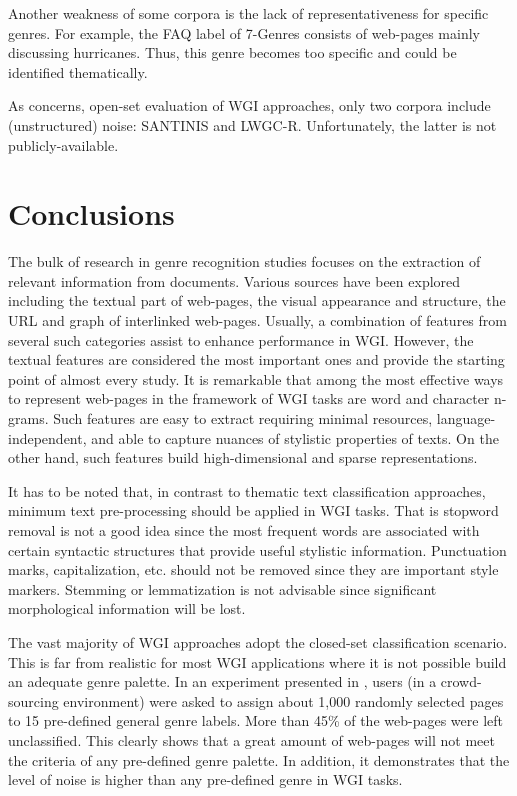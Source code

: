 \begin{itemize}
\begin{end}
Another weakness of some corpora is the lack of representativeness for specific genres. For example, the FAQ label of 7-Genres consists of web-pages mainly discussing hurricanes. Thus, this genre becomes too specific and could be identified thematically. 

As concerns, open-set evaluation of WGI approaches, only two corpora include (unstructured) noise: SANTINIS and LWGC-R. Unfortunately, the latter is not publicly-available. 

\section{Conclusions}\label{chap:relevant_work:sec:intro}

The bulk of research in genre recognition studies focuses on the extraction of relevant information from documents. Various sources have been explored including the textual part of web-pages, the visual appearance and structure, the URL and graph of interlinked web-pages. Usually, a combination of features from several such categories assist to enhance performance in WGI. However, the textual features are considered the most important ones and provide the starting point of almost every study. It is remarkable that among the most effective ways to represent web-pages in the framework of WGI tasks are word and character n-grams. Such features are easy to extract requiring minimal resources, language-independent, and able to capture nuances of stylistic properties of texts. On the other hand, such features build high-dimensional and sparse representations.

It has to be noted that, in contrast to thematic text classification approaches, minimum text pre-processing should be applied in WGI tasks. That is stopword removal is not a good idea since the most frequent words are associated with certain syntactic structures that provide useful stylistic information. Punctuation marks, capitalization, etc. should not be removed since they are important style markers. Stemming or lemmatization is not advisable since significant morphological information will be lost.

The vast majority of WGI approaches adopt the closed-set classification scenario. This is far from realistic for most WGI applications where it is not possible build an adequate genre palette. In an experiment presented in , users (in a crowd-sourcing environment) were asked to assign about 1,000 randomly selected pages to 15 pre-defined general genre labels. More than 45\% of the web-pages were left unclassified. This clearly shows that a great amount of web-pages will not meet the criteria of any pre-defined genre palette. In addition, it demonstrates that the level of noise is higher than any pre-defined genre in WGI tasks. 


\end{end}
\end{itemize}

